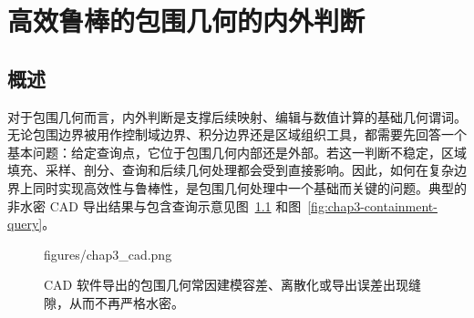 \chapter{高效鲁棒的包围几何的内外判断}

\providecommand{\Bezier}{B\'{e}zier }
\providecommand{\tr}[1]{#1}
\providecommand{\tb}[1]{#1}
\providecommand{\todo}[1]{}
\providecommand{\argmin}{\mathop{\mathrm{arg\,min}}\limits}
\providecommand{\argmax}{\mathop{\mathrm{arg\,max}}\limits}
\providecommand{\res}{\mathop{\mathrm{Res}}}
\providecommand{\re}{\mathop{\mathrm{Re}}}
\providecommand{\im}{\mathop{\mathrm{Im}}}

\makeatletter
{}
\makeatother

\def \ma {\mathbf{a}}
\def \me {\mathbf{e}}
\def \mb {\mathbf{b}}
\def \mc {\mathbf{c}}
\def \md {\mathbf{d}}
\def \mf {\mathbf{f}}
\def \mg {\mathbf{g}}
\def \mh {\mathbf{h}}
\def \mi {\mathbf{i}}
\def \mj {\mathbf{j}}
\def \mk {\mathbf{k}}
\def \ml {\mathbf{l}}
\def \mm {\mathbf{m}}
\def \mn {\mathbf{n}}
\def \mo {\mathbf{o}}
\def \mp {\mathbf{p}}
\def \mq {\mathbf{q}}
\def \mr {\mathbf{r}}
\def \ms {\mathbf{s}}
\def \mt {\mathbf{t}}
\def \muu {\mathbf{u}}
\def \mv {\mathbf{v}}
\def \mw {\mathbf{w}}
\def \mx {\mathbf{x}}
\def \my {\mathbf{y}}
\def \mz {\mathbf{z}}

\section{概述}\label{sec:chap3-query-overview}
对于包围几何而言，内外判断是支撑后续映射、编辑与数值计算的基础几何谓词。无论包围边界被用作控制域边界、积分边界还是区域组织工具，都需要先回答一个基本问题：给定查询点，它位于包围几何内部还是外部。若这一判断不稳定，区域填充、采样、剖分、查询和后续几何处理都会受到直接影响。因此，如何在复杂边界上同时实现高效性与鲁棒性，是包围几何处理中一个基础而关键的问题。典型的非水密 CAD 导出结果与包含查询示意见图~\ref{fig:chap3-cad-nonwatertight} 和图~\ref{fig:chap3-containment-query}。

\begin{figure}[t]
	\centering
	\begin{overpic}[width=0.96\linewidth,percent]{figures/chap3_cad.png}
	\end{overpic}
	\caption{CAD 软件导出的包围几何常因建模容差、离散化或导出误差出现缝隙，从而不再严格水密。}
	\label{fig:chap3-cad-nonwatertight}
\end{figure}

